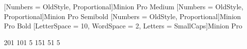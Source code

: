 
\usepackage{xspace, xparse, xcolor}

\usepackage[fullfamily, opticals, mathlf, swash, openg, minionint, onlymath]{MinionPro}
\usepackage[protrusion = true, expansion = false]{microtype}
\usepackage{fontspec, ifluatex}
\setmainfont[Numbers = {OldStyle, Proportional}]{Minion Pro}
\setmonofont[Numbers = {Uppercase, Monospaced}]{Minion Pro} %
\newfontface{\mediumface}[Numbers = {OldStyle, Proportional}]{Minion Pro Medium}
\newfontface{\semiboldface}[Numbers = {OldStyle, Proportional}]{Minion Pro Semibold}
\newfontface{\boldface}[Numbers = {OldStyle, Proportional}]{Minion Pro Bold}
\newfontface{\widescface}[LetterSpace = 10, WordSpace = 2, Letters = SmallCaps]{Minion Pro}
\newcommand*{\textbbf}[1]{{\boldface#1}}
\linespread{1.2}

 201 101 5 %
 151 51 5  %

\renewcommand*{\labelenumi}{\textbbf{\roman{enumi}}}
\renewcommand*{\labelitemi}{◆}

\renewcommand*{\pm}{\textup{±}}
\renewcommand*{\approx}{\operatorname{\textup{≈}}}
\renewcommand*{\times}{\operatorname{\textup{×}}}
\renewcommand*{\ldots}{\textup{…}}
\renewcommand*{\prod}{\mathop{\mbox{\LARGE\raisebox{-0.15em}{∏}}}\displaylimits}
\renewcommand*{\coprod}{\mathop{\mbox{\LARGE\raisebox{-0.15em}{\rotatebox[origin=c]{180}{∏}}}}\displaylimits}

\newcommand*{\hodge}{{\textup{\small ✳}}} %
\newcommand*{\leafornamentclosed}{❧}
\ifluatex
\newcommand*{\leafornamentline}{\leafornamentclosed}
\newcommand*{\leafornamentopen}{\leafornamentclosed}
\newcommand*{\lineornament}{—}
\else
\newcommand*{\leafornamentline}{\XeTeXglyph1253}
\newcommand*{\leafornamentopen}{\XeTeXglyph1260}
\newcommand*{\lineornament}{\XeTeXglyph1270}
\fi
\newcommand*{\closewithleafornament}{\begin{center}\vspace{2\parskip}\leafornamentclosed\end{center}}
\newcommand*{\closewithlineornament}{\begin{center}\vspace{2\parskip}\lineornament\end{center}}

